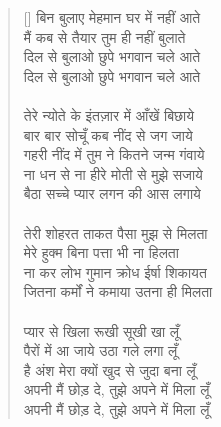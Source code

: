 \begin{verse}[\versewidth]\texthindi{
बिन बुलाए मेहमान घर में नहीं आते\\
मैं कब से तैयार तुम ही नहीं बुलाते\\
दिल से बुलाओ छुपे भगवान चले आते\\
दिल से बुलाओ छुपे भगवान चले आते\\
\\
तेरे न्योते के इंतज़ार में आँखें बिछाये\\
बार बार सोचूँ कब नींद से जग जाये\\
गहरी नींद में तुम ने कितने जन्म गंवाये\\
ना धन से ना हीरे मोती से मुझे सजाये\\
बैठा सच्चे प्यार लगन की आस लगाये\\
\\
तेरी शोहरत ताकत पैसा मुझ से मिलता\\
मेरे हुक्म बिना पत्ता भी ना हिलता\\
ना कर लोभ गुमान क्रोध ईर्षा शिकायत\\
जितना कर्मों ने कमाया उतना ही मिलता\\
\\
प्यार से खिला रूखी सूखी खा लूँ\\
पैरों में आ जाये उठा गले लगा लूँ\\
है अंश मेरा क्यों खुद से जुदा बना लूँ\\
अपनी मैं छोड़ दे, तुझे अपने में मिला लूँ\\
अपनी मैं छोड़ दे, तुझे अपने में मिला लूँ
}
\end{verse}

